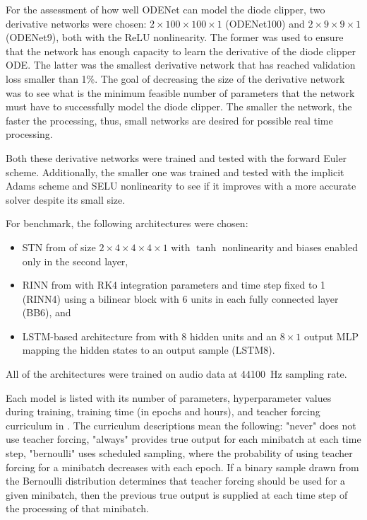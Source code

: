 For the assessment of how well ODENet can model the diode clipper, two derivative networks were chosen: $2 \times 100 \times 100 \times 1$ (ODENet100) and $2 \times 9 \times 9 \times 1$ (ODENet9), both with the \ac{ReLU} nonlinearity. The former was used to ensure that the network has enough capacity to learn the derivative of the diode clipper \ac{ODE}. The latter was the smallest derivative network that has reached validation loss smaller than 1\%. The goal of decreasing the size of the derivative network was to see what is the minimum feasible number of parameters that the network must have to successfully model the diode clipper. The smaller the network, the faster the processing, thus, small networks are desired for possible real time processing.

Both these derivative networks were trained and tested with the forward Euler scheme. Additionally, the smaller one was trained and tested with the implicit Adams scheme and \ac{SELU} nonlinearity to see if it improves with a more accurate solver despite its small size.

For benchmark, the following architectures were chosen:
\begin{itemize}
    \item \ac{STN} from \cite{Parker2019} of size $2 \times 4 \times 4 \times 4 \times 1$ with $\tanh$ nonlinearity and biases enabled only in the second layer, 
    \item \ac{RINN} from \cite{Ouala2019} with \ac{RK}4 integration parameters and time step fixed to 1 (\ac{RINN}4) using a bilinear block with 6 units in each fully connected layer (BB6), and 
    \item \ac{LSTM}-based architecture from \cite{Wright2019} with 8 hidden units and an $8 \times 1$ output \ac{MLP} mapping the hidden states to an output sample (\ac{LSTM}8).
\end{itemize}

All of the architectures were trained on audio data at \SI{44100}{Hz} sampling rate.

Each model is listed with its number of parameters,
hyperparameter values during training, training time (in epochs and hours), and teacher forcing curriculum in . The curriculum descriptions mean the following: "never" does not use teacher forcing, "always" provides true output for each minibatch at each time step, "bernoulli" uses scheduled sampling, where the probability of using teacher forcing for a minibatch decreases with each epoch. If a binary sample drawn from the Bernoulli distribution determines that teacher forcing should be used for a given minibatch, then the previous true output is supplied at each time step of the processing of that minibatch.

